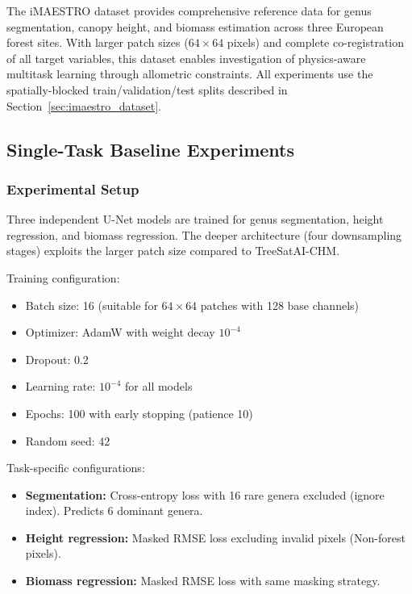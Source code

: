 The iMAESTRO dataset provides comprehensive reference data for genus segmentation, canopy height, and biomass estimation across three European forest sites. With larger patch sizes ($64\times 64$ pixels) and complete co-registration of all target variables, this dataset enables investigation of physics-aware multitask learning through allometric constraints. All experiments use the spatially-blocked train/validation/test splits described in Section~\ref{sec:imaestro_dataset}.

\subsection{Single-Task Baseline Experiments}

\subsubsection{Experimental Setup}

Three independent U-Net models are trained for genus segmentation, height regression, and biomass regression. The deeper architecture (four downsampling stages) exploits the larger patch size compared to TreeSatAI-CHM.

Training configuration:
\begin{itemize}
    \item Batch size: 16 (suitable for $64\times 64$ patches with 128 base channels)
    \item Optimizer: AdamW with weight decay $10^{-4}$
    \item Dropout: 0.2
    \item Learning rate: $10^{-4}$ for all models
    \item Epochs: 100 with early stopping (patience 10)
    \item Random seed: 42
\end{itemize}

Task-specific configurations:

\begin{itemize}
    \item \textbf{Segmentation:} Cross-entropy loss with 16 rare genera excluded (ignore index). Predicts 6 dominant genera.
    \item \textbf{Height regression:} Masked RMSE loss excluding invalid pixels (Non-forest pixels).
    \item \textbf{Biomass regression:} Masked RMSE loss with same masking strategy.
\end{itemize}

